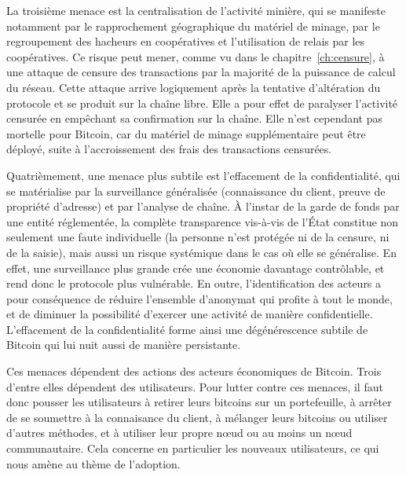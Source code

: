 La troisième menace est la centralisation de l'activité minière, qui se manifeste notamment par le rapprochement géographique du matériel de minage, par le regroupement des hacheurs en coopératives et l'utilisation de relais par les coopératives. Ce risque peut mener, comme vu dans le chapitre~\ref{ch:censure}, à une attaque de censure des transactions par la majorité de la puissance de calcul du réseau. Cette attaque arrive logiquement après la tentative d'altération du protocole et se produit sur la chaîne libre. Elle a pour effet de paralyser l'activité censurée en empêchant sa confirmation sur la chaîne. Elle n'est cependant pas mortelle pour Bitcoin, car du matériel de minage supplémentaire peut être déployé, suite à l'accroissement des frais des transactions censurées. %

Quatrièmement, une menace plus subtile est l'effacement de la confidentialité, qui se matérialise par la surveillance généralisée (connaissance du client, preuve de propriété d'adresse) et par l'analyse de chaîne. À l'instar de la garde de fonds par une entité réglementée, la complète transparence vis-à-vis de l'État constitue non seulement une faute individuelle (la personne n'est protégée ni de la censure, ni de la saisie), mais aussi un risque systémique dans le cas où elle se généralise. En effet, une surveillance plus grande crée une économie davantage contrôlable, et rend donc le protocole plus vulnérable. En outre, l'identification des acteurs a pour conséquence de réduire l'ensemble d'anonymat qui profite à tout le monde, et de diminuer la possibilité d'exercer une activité de manière confidentielle. L'effacement de la confidentialité forme ainsi une dégénérescence subtile de Bitcoin qui lui nuit aussi de manière persistante. %

Ces menaces dépendent des actions des acteurs économiques de Bitcoin. Trois d'entre elles dépendent des utilisateurs. Pour lutter contre ces menaces, il faut donc pousser les utilisateurs à retirer leurs bitcoins sur un portefeuille, à arrêter de se soumettre à la connaisance du client, à mélanger leurs bitcoins ou utiliser d'autres méthodes, et à utiliser leur propre nœud ou au moins un nœud communautaire. Cela concerne en particulier les nouveaux utilisateurs, ce qui nous amène au thème de l'adoption.


